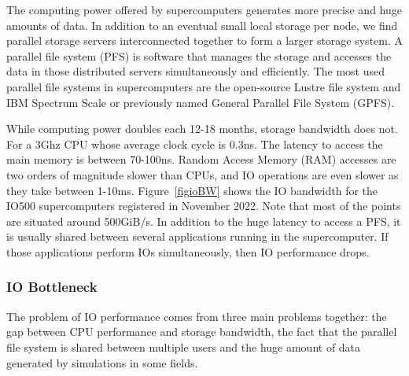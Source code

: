 The computing power offered by supercomputers generates more precise and huge amounts of data. In addition to an eventual small local storage per node, we find parallel storage servers interconnected together to form a larger storage system. 
A parallel file system (PFS) is software that manages the storage and accesses the data in those distributed servers simultaneously and efficiently. The most used parallel file systems in supercomputers are the open-source Lustre\cite{lustre} file system and IBM  Spectrum Scale or previously named General Parallel File System (GPFS)\cite{gpfs}.   

 While computing power doubles each 12-18 months, storage bandwidth does not.
For a 3Ghz CPU whose average clock cycle is 0.3ns. The latency to access the main memory is between 70-100ns. Random Access Memory (RAM) accesses are two orders of magnitude slower than CPUs, and IO operations are even slower as they take between 1-10ms.
Figure~\ref{figioBW} shows the IO bandwidth for the IO500 supercomputers registered in November 2022. Note that most of the points are situated around 500GiB/s.    
In addition to the huge latency to access a PFS, it is usually shared between several applications running in the supercomputer. If those applications perform IOs simultaneously, then IO performance drops.  


\subsubsection{IO Bottleneck}\label{sec:iobottleneck}

The problem of IO performance comes from three main problems together: the gap between CPU performance and storage bandwidth, the fact that the parallel file system is shared between multiple users and the huge amount of data generated by simulations in some fields.  

